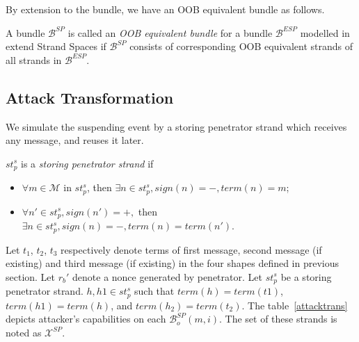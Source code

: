By extension to the bundle, we have an OOB equivalent bundle as follows. 

\begin{Definition}\label{iopmf} A bundle $\mathcal{B}^{SP}$ is called an \emph{OOB equivalent bundle} for a bundle $\mathcal{B}^{ESP}$ modelled in extend Strand Spaces if $\mathcal{B}^{SP}$ consists of corresponding OOB equivalent strands of all strands in $\mathcal{B}^{ESP}$. 
\end{Definition}

\subsection{Attack Transformation}\label{attacktransform}

We simulate the suspending event by a storing penetrator strand which receives any message, and reuses it later. 

\begin{Definition}
$st^s_p$ is a \emph{storing penetrator strand} if 
\begin{itemize}
\item $\forall m \in \mathcal{M}$ in $st^s_p$, then $\exists n \in st^s_p, sign(n) = -, term(n) = m$;
\item $\forall n' \in st^s_p, sign(n') = +,$ then $\exists n \in st^s_p, sign(n)= -, term(n)= term(n')$.
\end{itemize}
\end{Definition}

Let $t_1$, $t_2$, $t_3$ respectively denote terms of first message, second message (if existing) and third message (if existing) in the four shapes defined in previous section. Let $r_b'$ denote a nonce generated by penetrator. Let $st^s_p$ be a storing penetrator strand. $h, h1\in st^s_p$ such that $term(h) = term(t1)$, $term(h1) = term(h)$, and $term(h_2) = term(t_2)$. The table~\ref{attacktrans} depicts attacker's capabilities on each $\mathcal{B}^{SP}_o(m,i)$. The set of these strands is noted as $\mathcal{X}^{SP}$.  

